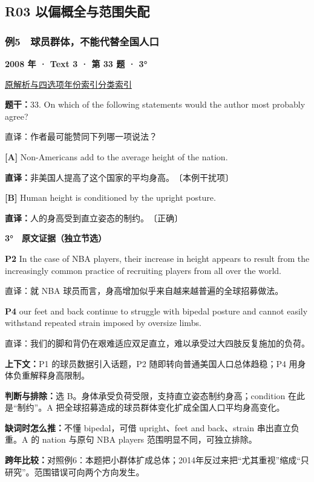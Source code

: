 \documentclass[11pt,a4paper]{article}
\begin{document}
\subsection{R03 以偏概全与范围失配}
\subsubsection{例5　球员群体，不能代替全国人口}\label{case-2008-T3-Q33}
\noindent\textbf{2008 年 · Text 3 · 第 33 题 · 3°}\par\noindent \href{https://zj139.github.io/math-notes/english/a46a979d6c43850d2b57732f/\#q33}{原解析与四选项}\quad \hyperref[idx-2008-T3-Q33]{年份索引}\quad \hyperref[class-R03]{分类索引}\par\smallskip
\noindent\textbf{题干：}33. On which of the following statements would the author most probably agree?\par
直译：作者最可能赞同下列哪一项说法？\par
{}\noindent\textbf{[A]} Non-Americans add to the average height of the nation.\par\nopagebreak
\noindent\textbf{直译：}非美国人提高了这个国家的平均身高。　〔本例干扰项〕\par
{}\noindent\textbf{[B]} Human height is conditioned by the upright posture.\par\nopagebreak
\noindent\textbf{直译：}人的身高受到直立姿态的制约。　〔正确〕\par
\begin{evidence}\textbf{3°　原文证据（独立节选）}\par
\textbf{P2} In the case of NBA players, their increase in height appears to result from the increasingly common practice of recruiting players from all over the world.\par 直译：就 NBA 球员而言，身高增加似乎来自越来越普遍的全球招募做法。\par
\textbf{P4} our feet and back continue to struggle with bipedal posture and cannot easily withstand repeated strain imposed by oversize limbs.\par 直译：我们的脚和背仍在艰难适应双足直立，难以承受过大四肢反复施加的负荷。\par
\end{evidence}
\noindent\textbf{上下文：}P1 的球员数据引入话题，P2 随即转向普通美国人口总体趋稳；P4 用身体负重解释身高限制。\par
\noindent\textbf{判断与排除：}选 B。身体承受负荷受限，支持直立姿态制约身高；condition 在此是“制约”。A 把全球招募造成的球员群体变化扩成全国人口平均身高变化。\par
\noindent\textbf{缺词时怎么推：}不懂 bipedal，可借 upright、feet and back、strain 串出直立负重。A 的 nation 与原句 NBA players 范围明显不同，可独立排除。\par
\noindent\textbf{跨年比较：}对照例6：本题把小群体扩成总体；2014年反过来把“尤其重视”缩成“只研究”。范围错误可向两个方向发生。\par
\clearpage
\end{document}
